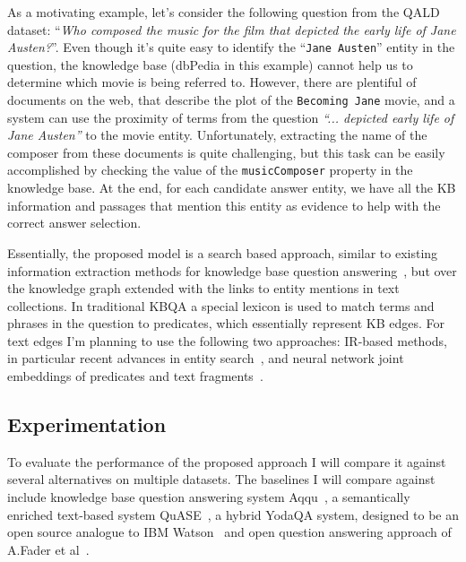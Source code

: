 As a motivating example, let's consider the following question from the QALD dataset: ``\textit{Who composed the music for the film that depicted the early life of Jane Austen?}''.
Even though it's quite easy to identify the ``\texttt{Jane Austen}'' entity in the question, the knowledge base (dbPedia in this example) cannot help us to determine which movie is being referred to.
However, there are plentiful of documents on the web, that describe the plot of the \texttt{Becoming Jane} movie, and a system can use the proximity of terms from the question \textit{``... depicted early life of Jane Austen''} to the movie entity.
Unfortunately, extracting the name of the composer from these documents is quite challenging, but this task can be easily accomplished by checking the value of the \texttt{musicComposer} property in the knowledge base.
At the end, for each candidate answer entity, we have all the KB information and passages that mention this entity as evidence to help with the correct answer selection.

Essentially, the proposed model is a search based approach, similar to existing information extraction methods for knowledge base question answering~\cite{YaoD14,bastmore:cikm:2015:aquu}, but over the knowledge graph extended with the links to entity mentions in text collections.
In traditional KBQA a special lexicon is used to match terms and phrases in the question to predicates, which essentially represent KB edges.
For text edges I'm planning to use the following two approaches: IR-based methods, in particular recent advances in entity search~\cite{zhiltsov2015fielded,nikolaev2016parameterized}, and neural network joint embeddings of predicates and text fragments~\cite{BordesCW14:emnlp,miller2016key}.

\subsection{Experimentation}
\label{section:factoid:proposal:experiments}

To evaluate the performance of the proposed approach I will compare it against several alternatives on multiple datasets.
The baselines I will compare against include knowledge base question answering system Aqqu~\cite{bastmore:cikm:2015:aquu}, a semantically enriched text-based system QuASE~\cite{Sun:2015:ODQ:2736277.2741651}, a hybrid YodaQA system, designed to be an open source analogue to IBM Watson~\cite{baudivs2015yodaqa} and open question answering approach of A.Fader et al~\cite{Fader:2014:OQA:2623330.2623677}.

